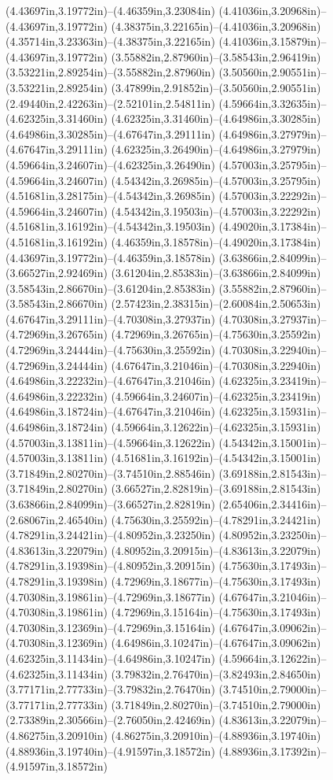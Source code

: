 (4.43697in,3.19772in)--(4.46359in,3.23084in) (4.41036in,3.20968in)--(4.43697in,3.19772in) (4.38375in,3.22165in)--(4.41036in,3.20968in) (4.35714in,3.23363in)--(4.38375in,3.22165in) (4.41036in,3.15879in)--(4.43697in,3.19772in) (3.55882in,2.87960in)--(3.58543in,2.96419in) (3.53221in,2.89254in)--(3.55882in,2.87960in) (3.50560in,2.90551in)--(3.53221in,2.89254in) (3.47899in,2.91852in)--(3.50560in,2.90551in) (2.49440in,2.42263in)--(2.52101in,2.54811in) (4.59664in,3.32635in)--(4.62325in,3.31460in) (4.62325in,3.31460in)--(4.64986in,3.30285in) (4.64986in,3.30285in)--(4.67647in,3.29111in) (4.64986in,3.27979in)--(4.67647in,3.29111in) (4.62325in,3.26490in)--(4.64986in,3.27979in) (4.59664in,3.24607in)--(4.62325in,3.26490in) (4.57003in,3.25795in)--(4.59664in,3.24607in) (4.54342in,3.26985in)--(4.57003in,3.25795in) (4.51681in,3.28175in)--(4.54342in,3.26985in) (4.57003in,3.22292in)--(4.59664in,3.24607in) (4.54342in,3.19503in)--(4.57003in,3.22292in) (4.51681in,3.16192in)--(4.54342in,3.19503in) (4.49020in,3.17384in)--(4.51681in,3.16192in) (4.46359in,3.18578in)--(4.49020in,3.17384in) (4.43697in,3.19772in)--(4.46359in,3.18578in) (3.63866in,2.84099in)--(3.66527in,2.92469in) (3.61204in,2.85383in)--(3.63866in,2.84099in) (3.58543in,2.86670in)--(3.61204in,2.85383in) (3.55882in,2.87960in)--(3.58543in,2.86670in) (2.57423in,2.38315in)--(2.60084in,2.50653in) (4.67647in,3.29111in)--(4.70308in,3.27937in) (4.70308in,3.27937in)--(4.72969in,3.26765in) (4.72969in,3.26765in)--(4.75630in,3.25592in) (4.72969in,3.24444in)--(4.75630in,3.25592in) (4.70308in,3.22940in)--(4.72969in,3.24444in) (4.67647in,3.21046in)--(4.70308in,3.22940in) (4.64986in,3.22232in)--(4.67647in,3.21046in) (4.62325in,3.23419in)--(4.64986in,3.22232in) (4.59664in,3.24607in)--(4.62325in,3.23419in) (4.64986in,3.18724in)--(4.67647in,3.21046in) (4.62325in,3.15931in)--(4.64986in,3.18724in) (4.59664in,3.12622in)--(4.62325in,3.15931in) (4.57003in,3.13811in)--(4.59664in,3.12622in) (4.54342in,3.15001in)--(4.57003in,3.13811in) (4.51681in,3.16192in)--(4.54342in,3.15001in) (3.71849in,2.80270in)--(3.74510in,2.88546in) (3.69188in,2.81543in)--(3.71849in,2.80270in) (3.66527in,2.82819in)--(3.69188in,2.81543in) (3.63866in,2.84099in)--(3.66527in,2.82819in) (2.65406in,2.34416in)--(2.68067in,2.46540in) (4.75630in,3.25592in)--(4.78291in,3.24421in) (4.78291in,3.24421in)--(4.80952in,3.23250in) (4.80952in,3.23250in)--(4.83613in,3.22079in) (4.80952in,3.20915in)--(4.83613in,3.22079in) (4.78291in,3.19398in)--(4.80952in,3.20915in) (4.75630in,3.17493in)--(4.78291in,3.19398in) (4.72969in,3.18677in)--(4.75630in,3.17493in) (4.70308in,3.19861in)--(4.72969in,3.18677in) (4.67647in,3.21046in)--(4.70308in,3.19861in) (4.72969in,3.15164in)--(4.75630in,3.17493in) (4.70308in,3.12369in)--(4.72969in,3.15164in) (4.67647in,3.09062in)--(4.70308in,3.12369in) (4.64986in,3.10247in)--(4.67647in,3.09062in) (4.62325in,3.11434in)--(4.64986in,3.10247in) (4.59664in,3.12622in)--(4.62325in,3.11434in) (3.79832in,2.76470in)--(3.82493in,2.84650in) (3.77171in,2.77733in)--(3.79832in,2.76470in) (3.74510in,2.79000in)--(3.77171in,2.77733in) (3.71849in,2.80270in)--(3.74510in,2.79000in) (2.73389in,2.30566in)--(2.76050in,2.42469in) (4.83613in,3.22079in)--(4.86275in,3.20910in) (4.86275in,3.20910in)--(4.88936in,3.19740in) (4.88936in,3.19740in)--(4.91597in,3.18572in) (4.88936in,3.17392in)--(4.91597in,3.18572in) 